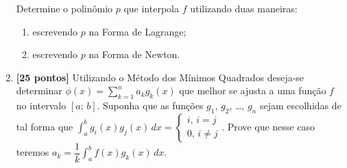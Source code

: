 \documentclass[10pt,a4paper]{article}
\begin{document}
\begin{enumerate}
  Determine o polinômio $p$ que interpola $f$ utilizando duas maneiras:
  \begin{enumerate}
   \item escrevendo $p$ na Forma de Lagrange;
   \item escrevendo $p$ na Forma de Newton.
  \end{enumerate}

 \item \textbf{[25 pontos]} Utilizando o Método dos Mínimos Quadrados deseja-se determinar $\displaystyle \phi(x) = \sum_{k=1}^n a_kg_k(x)$ que melhor se ajusta 
a uma função $f$ no intervalo $[a;\, b]$. Suponha que as funções $g_1$, $g_2$, \ldots, $g_n$ sejam escolhidas de tal forma que 
$\displaystyle\int_a^b g_i(x)g_j(x)\,dx = \begin{cases}i,\,i = j \\ 0,\,i\neq j\end{cases}$. Prove que nesse caso teremos 
$a_k = \dfrac{1}{k}\displaystyle\int_a^b f(x)g_k(x)\,dx$.


\end{enumerate}
\end{document}
